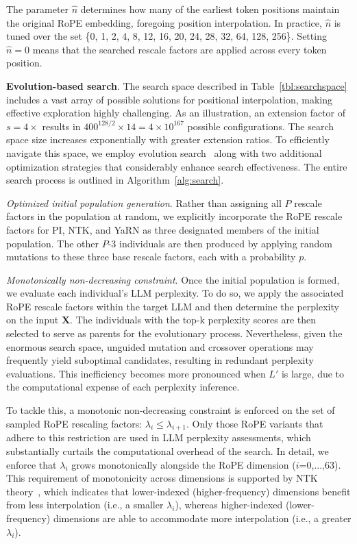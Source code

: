 The parameter $\hat{n}$ determines how many of the earliest token positions maintain the original RoPE embedding, foregoing position interpolation. In practice, $\hat{n}$ is tuned over the set \{0, 1, 2, 4, 8, 12, 16, 20, 24, 28, 32, 64, 128, 256\}. Setting $\hat{n}=0$ means that the searched rescale factors are applied across every token position.

\textbf{Evolution-based search}. The search space described in Table~\ref{tbl:searchspace} includes a vast array of possible solutions for positional interpolation, making effective exploration highly challenging. As an illustration, an extension factor of $s=4\times$ results in $400^{128/2}\times14=4\times10^{167}$ possible configurations. The search space size increases exponentially with greater extension ratios. To efficiently navigate this space, we employ evolution search~\cite{guo2020single} along with two additional optimization strategies that considerably enhance search effectiveness. The entire search process is outlined in Algorithm~\ref{alg:search}.

\textit{Optimized initial population generation}. Rather than assigning all $P$ rescale factors in the population at random, we explicitly incorporate the RoPE rescale factors for PI, NTK, and YaRN as three designated members of the initial population. The other $P$-3 individuals are then produced by applying random mutations to these three base rescale factors, each with a probability $p$.

\textit{Monotonically non-decreasing constraint}. Once the initial population is formed, we evaluate each individual's LLM perplexity. To do so, we apply the associated RoPE rescale factors within the target LLM and then determine the perplexity on the input $\mathbf{X}$. The individuals with the top-k perplexity scores are then selected to serve as parents for the evolutionary process. Nevertheless, given the enormous search space, unguided mutation and crossover operations may frequently yield suboptimal candidates, resulting in redundant perplexity evaluations. This inefficiency becomes more pronounced when $L'$ is large, due to the computational expense of each perplexity inference.

To tackle this, a monotonic non-decreasing constraint is enforced on the set of sampled RoPE rescaling factors: $\lambda_i\le \lambda_{i+1}$. Only those RoPE variants that adhere to this restriction are used in LLM perplexity assessments, which substantially curtails the computational overhead of the search. In detail, we enforce that $\lambda_i$ grows monotonically alongside the RoPE dimension ($i$=0,...,63). This requirement of monotonicity across dimensions is supported by NTK theory~\cite{jacot2018neural,tancik2020fourier,ntk}, which indicates that lower-indexed (higher-frequency) dimensions benefit from less interpolation (i.e., a smaller $\lambda_i$), whereas higher-indexed (lower-frequency) dimensions are able to accommodate more interpolation (i.e., a greater $\lambda_i$).

